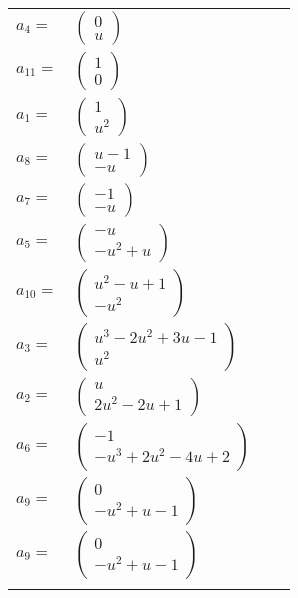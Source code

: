 \documentclass[1p]{elsarticle_modified}
\theoremstyle{definition}
\begin{document}
\begin{tabular}{m{7pt} m{180pt} m{7pt} m{180pt} }
\flushright $a_{4}=$&$\begin{pmatrix}0\\u\end{pmatrix}$ \\
\flushright $a_{11}=$&$\begin{pmatrix}1\\0\end{pmatrix}$ \\
\flushright $a_{1}=$&$\begin{pmatrix}1\\u^2\end{pmatrix}$ \\
\flushright $a_{8}=$&$\begin{pmatrix}u-1\\- u\end{pmatrix}$ \\
\flushright $a_{7}=$&$\begin{pmatrix}-1\\- u\end{pmatrix}$ \\
\flushright $a_{5}=$&$\begin{pmatrix}- u\\- u^2+u\end{pmatrix}$ \\
\flushright $a_{10}=$&$\begin{pmatrix}u^2- u+1\\- u^2\end{pmatrix}$ \\
\flushright $a_{3}=$&$\begin{pmatrix}u^3-2 u^2+3 u-1\\u^2\end{pmatrix}$ \\
\flushright $a_{2}=$&$\begin{pmatrix}u\\2 u^2-2 u+1\end{pmatrix}$ \\
\flushright $a_{6}=$&$\begin{pmatrix}-1\\- u^3+2 u^2-4 u+2\end{pmatrix}$ \\
\flushright $a_{9}=$&$\begin{pmatrix}0\\- u^2+u-1\end{pmatrix}$\\ \flushright $a_{9}=$&$\begin{pmatrix}0\\- u^2+u-1\end{pmatrix}$\\&\end{tabular}
\end{document}
